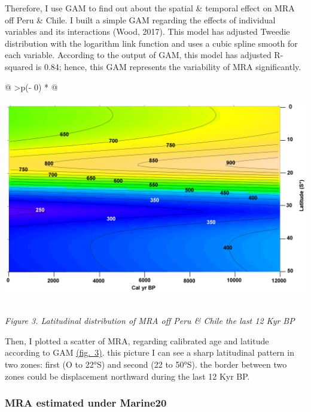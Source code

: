 \documentclass[
]{article}
\begin{document}
Therefore, I use GAM to find out about the spatial \& temporal effect on
MRA off Peru \& Chile. I built a simple GAM regarding the effects of
individual variables and its interactions (Wood, 2017). This model has
adjusted Tweedie distribution with the logarithm link function and uses
a cubic spline smooth for each variable. According to the output of GAM,
this model has adjusted R-squared is 0.84; hence, this GAM represents
the variability of MRA significantly.

\begin{longtable}[]{@{}
  >{\centering\arraybackslash}p{(\columnwidth - 0\tabcolsep) * }@{}}
\toprule
\begin{minipage}[b]{\linewidth}\centering
\href{https://github.com/jasb3110/Radiocarbon-reservoir/blob/5c906b5d15b85dd72416e0abd3e72d53126c9b7b/GAM\%20radiocarbon\%20heat\%20map.png}{\includegraphics{GAM radiocarbon heat map.png}}
\end{minipage} \\
\midrule
\endhead
\emph{Figure 3. Latitudinal distribution of MRA off Peru \& Chile the
last 12 Kyr BP} \\
\bottomrule
\end{longtable}

Then, I plotted a scatter of MRA, regarding calibrated age and latitude
according to GAM
\protect\hyperlink{latitudinal-distribution-of-mra}{(fig.~3)}. this
picture I can see a sharp latitudinal pattern in two zones: first (O to
22°S) and second (22 to 50°S). the border between two zones could be
displacement northward during the last 12 Kyr BP.

\hypertarget{mra-estimated-under-marine20}{%
\subsubsection{MRA estimated under
Marine20}\label{mra-estimated-under-marine20}}
\end{document}
